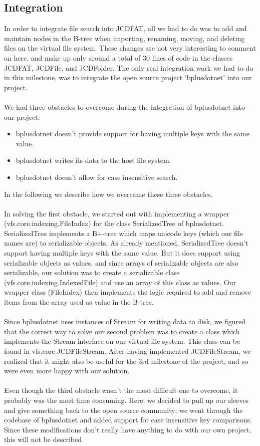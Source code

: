 \documentclass[a4paper,12pt]{article}
\begin{document}
\subsection{Integration}
\label{sec:integration}
In order to integrate file search into JCDFAT, all we had to do was to add and maintain nodes in the B-tree when importing, renaming, moving, and deleting files on the virtual file system. These changes are not very interesting to comment on here, and make up only around a total of 30 lines of code in the classes JCDFAT, JCDFile, and JCDFolder. The only real integration work we had to do in this milestone, was to integrate the open source project `bplusdotnet' into our project.\\
\\
We had three obstacles to overcome during the integration of bplusdotnet into our project:
\begin{itemize}
    \item bplusdotnet doesn't provide support for having multiple keys with the same value.
    \item bplusdotnet writes its data to the host file system.
    \item bplusdotnet doesn't allow for case insensitive search.
\end{itemize}
In the following we describe how we overcame these three obstacles.\\
\\
In solving the first obstacle, we started out with implementing a wrapper (vfs.core.indexing.FileIndex) for the class SerializedTree of bplusdotnet. SerializedTree implements a B+-tree which maps unicode keys (which our file names are) to serializable objects. As already mentioned, SerializedTree doesn't support having multiple keys with the same value. But it does support using serializable objects as values, and since arrays of serializable objects are also serializable, our solution was to create a serializable class (vfs.core.indexing.IndexedFile) and use an array of this class as values. Our wrapper class (FileIndex) then implements the logic required to add and remove items from the array used as value in the B-tree.\\
\\
Since bplusdotnet uses instances of Stream for writing data to disk, we figured that the correct way to solve our second problem was to create a class which implements the Stream interface on our virtual file system. This class can be found in vfs.core.JCDFileStream. After having implemented JCDFileStream, we realized that it might also be useful for the 3rd milestone of the project, and so were even more happy with our solution.\\
\\
Even though the third obstacle wasn't the most difficult one to overcome, it probably was the most time consuming. Here, we decided to pull up our sleeves and give something back to the open source community; we went through the codebase of bplusdotnet and added support for case insensitive key comparisons. Since these modifications don't really have anything to do with our own project, this will not be described
\end{document}
